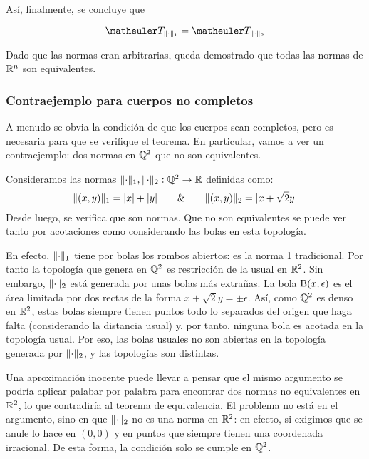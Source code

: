 Así, finalmente, se concluye que

\begin{equation}
\T_{\norm{\cdot}_1}=\T_{\norm{\cdot}_2}
\end{equation}

Dado que las normas eran arbitrarias, queda demostrado que todas las normas de $\mathbb{R}^n$ son equivalentes.

\subsubsection{Contraejemplo para cuerpos no completos}

A menudo se obvia la condición de que los cuerpos sean completos, pero es necesaria para que se verifique el teorema. En particular, vamos a ver un contraejemplo: dos normas en $\mathbb{Q}^2$ que no son equivalentes.

Consideramos las normas $\lVert\cdot\rVert_1,\lVert\cdot\rVert_2:\mathbb{Q}^2\to\mathbb{R}$ definidas como:
\[\lVert(x,y)\rVert_1 = \lvert x\rvert+\lvert y\rvert\quad\quad\&\quad\quad \lVert(x,y)\rVert_2 = \lvert x+\sqrt{2}y\rvert\]
Desde luego, se verifica que son normas. Que no son equivalentes se puede ver tanto por acotaciones como considerando las bolas en esta topología.

En efecto, $\lVert\cdot\rVert_1$ tiene por bolas los rombos abiertos: es la norma 1 tradicional. Por tanto la topología que genera en $\mathbb{Q}^2$ es restricción de la usual en $\mathbb{R}^2$. Sin embargo, $\lVert\cdot\rVert_2$ está generada por unas bolas más extrañas. La bola $\operatorname{B}(x,\epsilon)$ es el área limitada por dos rectas de la forma $x+\sqrt{2}y=\pm\epsilon$. Así, como $\mathbb{Q}^2$ es denso en $\mathbb{R}^2$, estas bolas siempre tienen puntos todo lo separados del origen que haga falta (considerando la distancia usual) y, por tanto, ninguna bola es acotada en la topología usual. Por eso, las bolas usuales no son abiertas en la topología generada por $\lVert\cdot\rVert_2$, y las topologías son distintas.

Una aproximación inocente puede llevar a pensar que el mismo argumento se podría aplicar palabar por palabra para encontrar dos normas no equivalentes en $\mathbb{R}^2$, lo que contradiría al teorema de equivalencia. El problema no está en el argumento, sino en que $\lVert\cdot\rVert_2$ no es una norma en $\mathbb{R}^2$: en efecto, si exigimos que se anule lo hace en $(0,0)$ y en puntos que siempre tienen una coordenada irracional. De esta forma, la condición solo se cumple en $\mathbb{Q}^2$. 